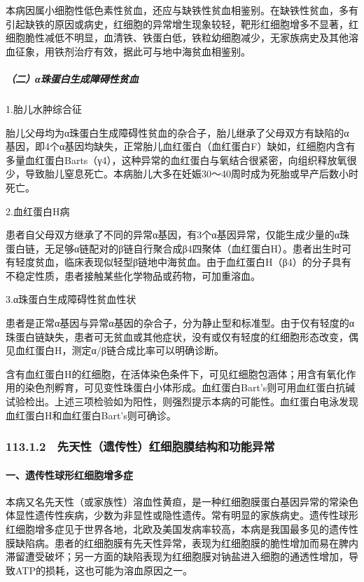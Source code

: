 本病因属小细胞性低色素性贫血，还应与缺铁性贫血相鉴别。在缺铁性贫血，多有引起缺铁的原因或病史，红细胞的异常增生现象较轻，靶形红细胞增多不显著，红细胞脆性减低不明显，血清铁、铁蛋白低，铁粒幼细胞减少，无家族病史及其他溶血征象，用铁剂治疗有效，据此可与地中海贫血相鉴别。

\subparagraph{（二）α珠蛋白生成障碍性贫血}

1.胎儿水肿综合征%

胎儿父母均为α珠蛋白生成障碍性贫血的杂合子，胎儿继承了父母双方有缺陷的α基因，即4个α基因均缺失，正常胎儿血红蛋白（血红蛋白F）缺如，红细胞内含有多量血红蛋白Barts（γ4），这种异常的血红蛋白与氧结合很紧密，向组织释放氧很少，导致胎儿窒息死亡。本病胎儿大多在妊娠30～40周时成为死胎或早产后数小时死亡。

2.血红蛋白H病%

患者自父母双方继承了不同的异常α基因，有3个α基因异常，仅能生成少量的α珠蛋白链，无足够α链配对的β链自行聚合成β4四聚体（血红蛋白H）。患者出生时可有轻度贫血，临床表现似轻型β链地中海贫血。由于血红蛋白H（β4）的分子具有不稳定性质，患者接触某些化学物品或药物，可加重溶血。

3.α珠蛋白生成障碍性贫血性状%

患者是正常α基因与异常α基因的杂合子，分为静止型和标准型。由于仅有轻度的α珠蛋白链缺失，患者可无贫血或其他症状，没有或仅有轻度的红细胞形态改变，偶见血红蛋白H，测定α/β链合成比率可以明确诊断。

含有血红蛋白H的红细胞，在活体染色条件下，可见红细胞包涵体；用含有氧化作用的染色剂孵育，可见变性珠蛋白小体形成。血红蛋白Bart's则可用血红蛋白抗碱试验检出。上述三项检验如为阳性，则强烈提示本病的可能性。血红蛋白电泳发现血红蛋白H和血红蛋白Bart's则可确诊。

\subsubsection{113.1.2　先天性（遗传性）红细胞膜结构和功能异常}

\paragraph{一、遗传性球形红细胞增多症}

本病又名先天性（或家族性）溶血性黄疸，是一种红细胞膜蛋白基因异常的常染色体显性遗传性疾病，少数为非显性或隐性遗传。常有明显的家族病史。遗传性球形红细胞增多症见于世界各地，北欧及美国发病率较高，本病是我国最多见的遗传性膜缺陷病。患者的红细胞膜有先天性异常，表现为红细胞膜的脆性增加而易在脾内滞留遭受破坏；另一方面的缺陷表现为红细胞膜对钠盐进入细胞的通透性增加，导致ATP的损耗，这也可能为溶血原因之一。

